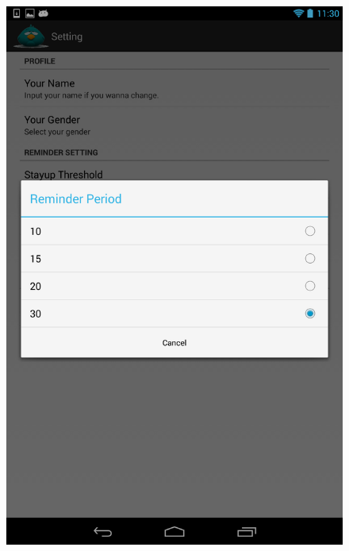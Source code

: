 \documentclass[14pt]{extreport}
\begin{document}
\begin{figure}[h]
\begin{center}
\includegraphics[width=5in]{preference_reminder_period}
\end{center}
\end{figure}
\end{document}
